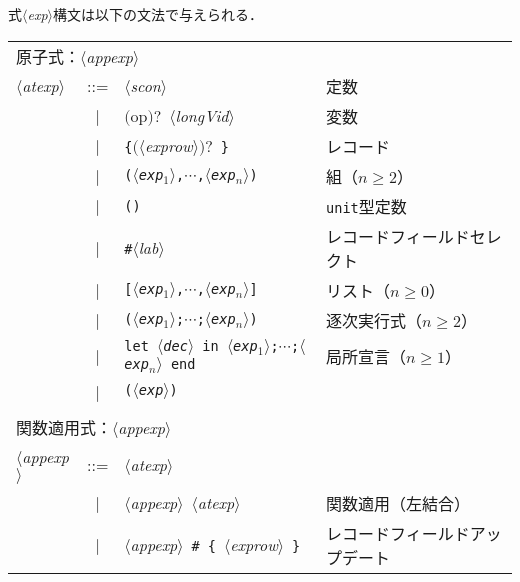 \documentclass{jbook}
\newcommand{\vbar}{\mbox{\ $|$\ }}
\newcommand{\nonterm}[1]{\mbox{$\langle$}{\it #1}\mbox{$\rangle$}}
\newcommand{\term}[1]{\mbox{{\tt #1}}}
\newcommand{\optional}[1]{\mbox{$($}{\protect #1}\mbox{$)?$}}
\begin{document}
	式\nonterm{exp}構文は以下の文法で与えられる．

\begin{center}
\begin{tabular}{lcll}
\multicolumn{3}{l}{原子式：\nonterm{appexp}}
\\
\nonterm{atexp}&::=&
       \nonterm{scon} & 定数 \\
&\vbar&\optional{op}\ \nonterm{longVid} & 変数\\
&\vbar&\term{\{}\optional{\nonterm{exprow}}\ \term{\}}& レコード\\
&\vbar&\term{(\nonterm{exp$_1$},$\cdots$,\nonterm{exp$_n$})}& 組（$n\ge 2$）\\
&\vbar&\term{()}& \term{unit}型定数\\
&\vbar&\term{\#}\nonterm{lab}& レコードフィールドセレクト\\
&\vbar&\term{[\nonterm{exp$_1$},$\cdots$,\nonterm{exp$_n$}]}& リスト（$n\ge 0$）\\
&\vbar&\term{(\nonterm{exp$_1$};$\cdots$;\nonterm{exp$_n$})}& 逐次実行式（$n\ge 2$）\\
&\vbar&\term{let \nonterm{dec} in \nonterm{exp$_1$};$\cdots$;\nonterm{exp$_n$} end}& 局所宣言（$n\ge 1$）\\
&\vbar&\term{(\nonterm{exp})}& \\
\\
\multicolumn{3}{l}{関数適用式：\nonterm{appexp}}
\\
\nonterm{appexp}&::=&
         \nonterm{atexp} \\
&\vbar& \nonterm{appexp}\ \nonterm{atexp} & 関数適用（左結合）\\
&\vbar& \nonterm{appexp}\ \term{\#}\ \term{\{}\ \nonterm{exprow}\ \term{\}} 
           & レコードフィールドアップデート\\


\end{tabular}
\end{center}
\end{document}
